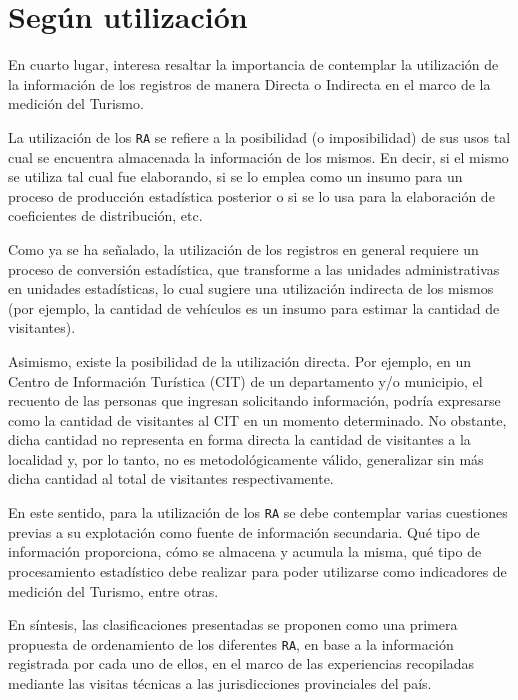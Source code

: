 \documentclass[
]{book}
\begin{document}
\hypertarget{seguxfan-utilizaciuxf3n}{%
\section{Según utilización}\label{seguxfan-utilizaciuxf3n}}

En cuarto lugar, interesa resaltar la importancia de contemplar la utilización de la información de los registros de manera Directa o Indirecta en el marco de la medición del Turismo.

La utilización de los \texttt{RA} se refiere a la posibilidad (o imposibilidad) de sus usos tal cual se encuentra almacenada la información de los mismos. En decir, si el mismo se utiliza tal cual fue elaborando, si se lo emplea como un insumo para un proceso de producción estadística posterior o si se lo usa para la elaboración de coeficientes de distribución, etc.

Como ya se ha señalado, la utilización de los registros en general requiere un proceso de conversión estadística, que transforme a las unidades administrativas en unidades estadísticas, lo cual sugiere una utilización indirecta de los mismos (por ejemplo, la cantidad de vehículos es un insumo para estimar la cantidad de visitantes).

Asimismo, existe la posibilidad de la utilización directa. Por ejemplo, en un Centro de Información Turística (CIT) de un departamento y/o municipio, el recuento de las personas que ingresan solicitando información, podría expresarse como la cantidad de visitantes al CIT en un momento determinado. No obstante, dicha cantidad no representa en forma directa la cantidad de visitantes a la localidad y, por lo tanto, no es metodológicamente válido, generalizar sin más dicha cantidad al total de visitantes respectivamente.

En este sentido, para la utilización de los \texttt{RA} se debe contemplar varias cuestiones previas a su explotación como fuente de información secundaria. Qué tipo de información proporciona, cómo se almacena y acumula la misma, qué tipo de procesamiento estadístico debe realizar para poder utilizarse como indicadores de medición del Turismo, entre otras.

En síntesis, las clasificaciones presentadas se proponen como una primera propuesta de ordenamiento de los diferentes \texttt{RA}, en base a la información registrada por cada uno de ellos, en el marco de las experiencias recopiladas mediante las visitas técnicas a las jurisdicciones provinciales del país.
\end{document}
